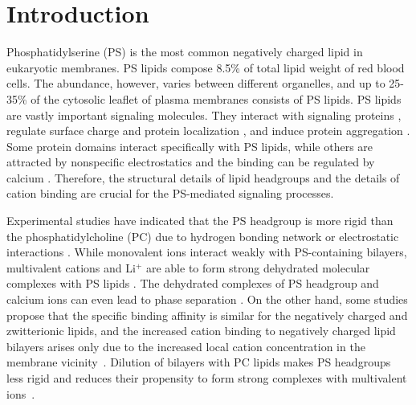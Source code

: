 \documentclass[aps,prl,superscriptaddress,twocolumn]{revtex4}
\begin{document}


\section{Introduction}
Phosphatidylserine (PS) is the most common negatively
charged lipid in eukaryotic membranes.
PS lipids compose 8.5\% of total lipid weight of red blood cells. 
The abundance, however, varies between different organelles, and up to
25-35\% of the cytosolic leaflet of plasma membranes \cite{lemmon08,leventis10,li14} consists of PS lipids.
PS lipids are vastly important signaling molecules. They interact with
signaling proteins \cite{leventis10}, regulate
surface charge and protein localization \cite{yeung08}, and
induce protein aggregation \cite{zhao04,gorbenko06}.
Some protein domains interact specifically with PS lipids,
while others are attracted by nonspecific electrostatics and the
binding can be regulated by calcium \cite{leventis10}.
Therefore, the structural details
of lipid headgroups and the details of cation binding
are crucial for the PS-mediated signaling processes.

Experimental studies have indicated that the
PS headgroup is more rigid than the phosphatidylcholine (PC)
due to hydrogen bonding network or
electrostatic interactions \cite{browning80,buldt81}.
While monovalent ions interact weakly with
PS-containing bilayers, multivalent cations and Li$^+$ are able to form strong
dehydrated molecular complexes with PS lipids \cite{hauser77,kurland79,eisenberg79,hauser83,dluhy83,hauser85,feigenson86,mattai89,roux90,roux91,boettcher11}. The dehydrated complexes of PS headgroup and calcium ions can even lead to
phase separation \cite{hauser77,kurland79,hauser85,feigenson86,mattai89,roux90,roux91}.
On the other hand, some studies propose that the specific binding
affinity is similar for the negatively charged and zwitterionic lipids, and
the increased cation binding to negatively charged lipid bilayers arises only due
to the increased local cation concentration in the membrane vicinity~\cite{seelig90,sinn06}.
Dilution of bilayers with PC lipids makes PS headgroups
less rigid and reduces their propensity to form
strong complexes with multivalent ions~\cite{browning80,buldt81,roux90,roux91}.
\end{document}
